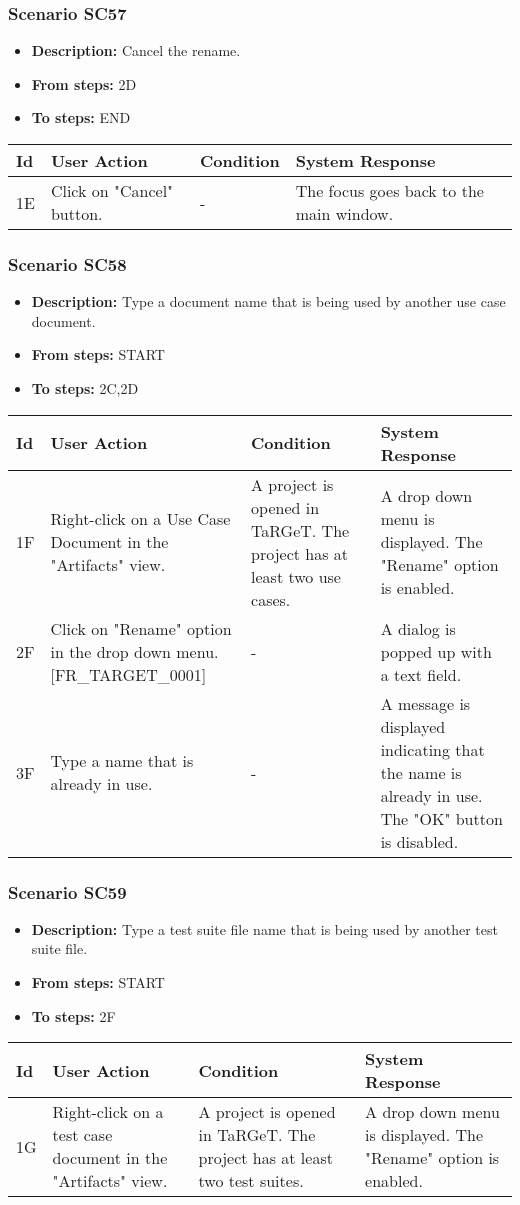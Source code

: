 \documentclass[a4paper,11pt]{article}
\newcommand{\bl}{\\ \hline}
\begin{document}
\subsubsection*{Scenario SC57}
\begin{itemize}
\item {\bf Description:} Cancel the rename.
\item {\bf From steps:} 2D
\item {\bf To steps:} END
\end{itemize}
\begin{tabular}{|p{0.4in}|p{1.5in}|p{1.5in}|p{1.5in}|}
\hline
Id & User Action & Condition & System Response \bl 
1E & Click on "Cancel" button. & - & The focus goes back to the main window.\bl
\end{tabular}
\subsubsection*{Scenario SC58}
\begin{itemize}
\item {\bf Description:} Type a document name that is being used by another use
					case document.
\item {\bf From steps:} START
\item {\bf To steps:} 2C,2D
\end{itemize}
\begin{tabular}{|p{0.4in}|p{1.5in}|p{1.5in}|p{1.5in}|}
\hline
Id & User Action & Condition & System Response \bl 
1F & Right-click on a Use Case Document in the "Artifacts" view.
					 & A project is opened in TaRGeT. The project has at least
						two use cases. & A drop down menu is displayed. The "Rename" option is
						enabled.\bl
2F & Click on "Rename" option in the drop down menu.
						[FR_TARGET_0001] & - & A dialog is popped up with a text field.\bl
3F & Type a name that is already in use. & - & A message is displayed indicating that the name is
						already in use. The "OK" button is disabled.\bl
\end{tabular}
\subsubsection*{Scenario SC59}
\begin{itemize}
\item {\bf Description:} Type a test suite file name that is being used by
					another test suite file.
\item {\bf From steps:} START
\item {\bf To steps:} 2F
\end{itemize}
\begin{tabular}{|p{0.4in}|p{1.5in}|p{1.5in}|p{1.5in}|}
\hline
Id & User Action & Condition & System Response \bl 
1G & Right-click on a test case document in the "Artifacts"
						view.  & A project is opened in TaRGeT. The project has at least
						two test suites. & A drop down menu is displayed. The "Rename" option is
						enabled.\bl
\end{tabular}
\end{document}
